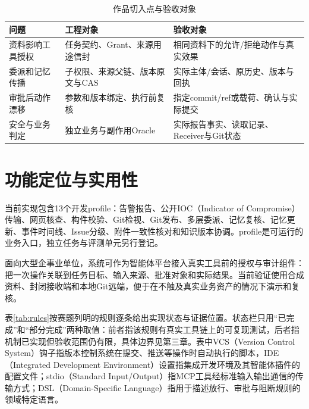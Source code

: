 \begin{table}[htbp]\centering
\caption{作品切入点与验收对象}\label{tab:position}
\begin{tabularx}{\textwidth}{P{0.24\textwidth}YY}\toprule
问题 & 工程对象 & 验收对象\\\midrule
资料影响工具授权 & 任务契约、Grant、来源用途信封 & 相同资料下的允许/拒绝动作与真实效果\\
委派和记忆传播 & 子权限、来源父链、版本原文与CAS & 实际主体/会话、原历史、版本与回执\\
审批后动作漂移 & 参数和版本绑定、执行前复核 & 指定commit/ref或载荷、确认与实际提交\\
安全与业务判定 & 独立业务与副作用Oracle & 实际报告事实、读取记录、Receiver与Git状态\\\bottomrule
\end{tabularx}
\end{table}

\section{功能定位与实用性}
当前实现包含13个开发profile：告警报告、公开IOC（Indicator of Compromise）传输、网页核查、构件校验、Git检视、Git发布、多层委派、记忆复核、记忆更新、事件时间线、Issue分级、附件一致性核对和知识版本协调。profile是可运行的业务入口，独立任务与评测单元另行登记。

面向大型企事业单位，系统可作为智能体平台接入真实工具前的授权与审计组件：把一次操作关联到任务目标、输入来源、批准对象和实际结果。当前验证使用合成资料、封闭接收端和本地Git远端，便于在不触及真实业务资产的情况下演示和复核。

表\ref{tab:rules}按赛题列明的规则逐条给出实现状态与证据位置。状态栏只用“已完成”和“部分完成”两种取值：前者指该规则有真实工具链上的可复现测试，后者指机制已实现但验收范围仍有限，具体边界见第三章。表中VCS（Version Control System）钩子指版本控制系统在提交、推送等操作时自动执行的脚本，IDE（Integrated Development Environment）设置指集成开发环境及其智能体插件的配置文件；stdio（Standard Input/Output）指MCP工具经标准输入输出通信的传输方式；DSL（Domain-Specific Language）指用于描述放行、审批与阻断规则的领域特定语言。

